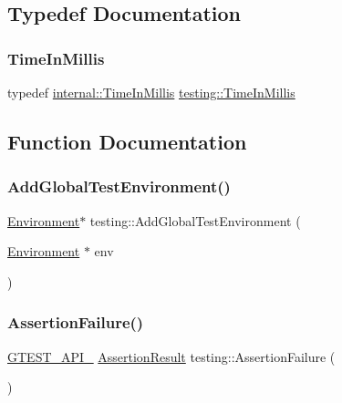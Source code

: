 \subsection{Typedef Documentation}
\mbox{\label{namespacetesting_a992de1d091ce660f451d1e8b3ce30fd6}} 
\subsubsection{\texorpdfstring{TimeInMillis}{TimeInMillis}}
{\footnotesize\ttfamily typedef \mbox{\hyperlink{namespacetesting_1_1internal_a66a845df404b38fe85c5e14a069f255a}{internal\+::\+Time\+In\+Millis}} \mbox{\hyperlink{namespacetesting_a992de1d091ce660f451d1e8b3ce30fd6}{testing\+::\+Time\+In\+Millis}}}



\subsection{Function Documentation}
\mbox{\label{namespacetesting_a460d7b998622e332392c1e00be3a60d5}} 
\subsubsection{\texorpdfstring{AddGlobalTestEnvironment()}{AddGlobalTestEnvironment()}}
{\footnotesize\ttfamily \mbox{\hyperlink{classtesting_1_1_environment}{Environment}}$\ast$ testing\+::\+Add\+Global\+Test\+Environment (\begin{DoxyParamCaption}\item[{\mbox{\hyperlink{classtesting_1_1_environment}{Environment}} $\ast$}]{env }\end{DoxyParamCaption})\hspace{0.3cm}{\ttfamily [inline]}}

\mbox{\label{namespacetesting_a8d91083190a5914bfe8c5666e2dbca9b}} 
\subsubsection{\texorpdfstring{AssertionFailure()}{AssertionFailure()}\hspace{0.1cm}{\footnotesize\ttfamily [1/2]}}
{\footnotesize\ttfamily \mbox{\hyperlink{gtest-port_8h_aa73be6f0ba4a7456180a94904ce17790}{G\+T\+E\+S\+T\+\_\+\+A\+P\+I\+\_\+}} \mbox{\hyperlink{classtesting_1_1_assertion_result}{Assertion\+Result}} testing\+::\+Assertion\+Failure (\begin{DoxyParamCaption}{ }\end{DoxyParamCaption})}

